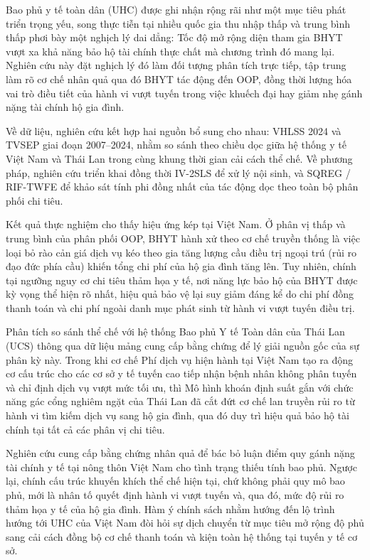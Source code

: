 \documentclass[12pt,a4paper]{article}
\begin{document}
Bao phủ y tế toàn dân (UHC) được ghi nhận rộng rãi như một mục tiêu phát triển trọng yếu, song thực tiễn tại nhiều quốc gia thu nhập thấp và trung bình thấp phơi bày một nghịch lý dai dẳng: Tốc độ mở rộng diện tham gia BHYT vượt xa khả năng bảo hộ tài chính thực chất mà chương trình đó mang lại. Nghiên cứu này đặt nghịch lý đó làm đối tượng phân tích trực tiếp, tập trung làm rõ cơ chế nhân quả qua đó BHYT tác động đến OOP, đồng thời lượng hóa vai trò điều tiết của hành vi vượt tuyến trong việc khuếch đại hay giảm nhẹ gánh nặng tài chính hộ gia đình.

Về dữ liệu, nghiên cứu kết hợp hai nguồn bổ sung cho nhau: VHLSS 2024 và TVSEP giai đoạn 2007--2024, nhằm so sánh theo chiều dọc giữa hệ thống y tế Việt Nam và Thái Lan trong cùng khung thời gian cải cách thể chế. Về phương pháp, nghiên cứu triển khai đồng thời IV-2SLS để xử lý nội sinh, và SQREG / RIF-TWFE để khảo sát tính phi đồng nhất của tác động dọc theo toàn bộ phân phối chi tiêu.

Kết quả thực nghiệm cho thấy hiệu ứng kép tại Việt Nam. Ở phân vị thấp và trung bình của phân phối OOP, BHYT hành xử theo cơ chế truyền thống là việc loại bỏ rào cản giá dịch vụ kéo theo gia tăng lượng cầu điều trị ngoại trú (rủi ro đạo đức phía cầu) khiến tổng chi phí của hộ gia đình tăng lên. Tuy nhiên, chính tại ngưỡng nguy cơ chi tiêu thảm họa y tế, nơi năng lực bảo hộ của BHYT được kỳ vọng thể hiện rõ nhất, hiệu quả bảo vệ lại suy giảm đáng kể do chi phí đồng thanh toán và chi phí ngoài danh mục phát sinh từ hành vi vượt tuyến điều trị.


Phân tích so sánh thể chế với hệ thống Bao phủ Y tế Toàn dân của Thái Lan (UCS) thông qua dữ liệu mảng cung cấp bằng chứng để lý giải nguồn gốc của sự phân kỳ này. Trong khi cơ chế Phí dịch vụ hiện hành tại Việt Nam tạo ra động cơ cấu trúc cho các cơ sở y tế tuyến cao tiếp nhận bệnh nhân không phân tuyến và chỉ định dịch vụ vượt mức tối ưu, thì Mô hình khoán định suất gắn với chức năng gác cổng nghiêm ngặt của Thái Lan đã cắt đứt cơ chế lan truyền rủi ro từ hành vi tìm kiếm dịch vụ sang hộ gia đình, qua đó duy trì hiệu quả bảo hộ tài chính tại tất cả các phân vị chi tiêu.

Nghiên cứu cung cấp bằng chứng nhân quả để bác bỏ luận điểm quy gánh nặng tài chính y tế tại nông thôn Việt Nam cho tình trạng thiếu tính bao phủ. Ngược lại, chính cấu trúc khuyến khích thể chế hiện tại, chứ không phải quy mô bao phủ, mới là nhân tố quyết định hành vi vượt tuyến và, qua đó, mức độ rủi ro thảm họa y tế của hộ gia đình. Hàm ý chính sách nhằm hướng đến lộ trình hướng tới UHC của Việt Nam đòi hỏi sự dịch chuyển từ mục tiêu mở rộng độ phủ sang cải cách đồng bộ cơ chế thanh toán và kiện toàn hệ thống tại tuyến y tế cơ sở.
\end{document}
